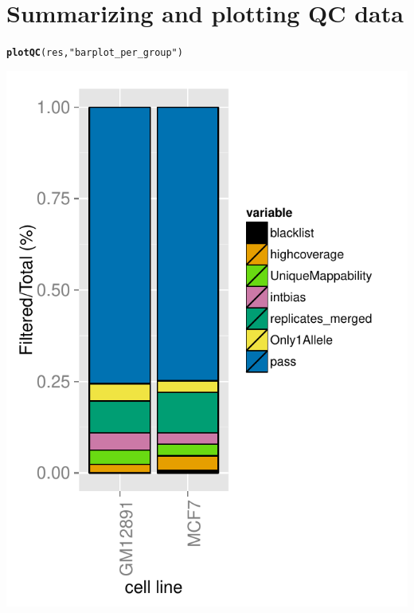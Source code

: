 \documentclass{article}\usepackage[]{graphicx}\usepackage[usenames,dvipsnames]{color}
\makeatletter
\def\maxwidth{ %
  \ifdim\Gin@nat@width>\linewidth
    \linewidth
  \else
    \Gin@nat@width
  \fi
}
\newcommand{\hlstr}[1]{\textcolor[rgb]{0.192,0.494,0.8}{#1}}%
\newcommand{\hlstd}[1]{\textcolor[rgb]{0.345,0.345,0.345}{#1}}%
\newcommand{\hlkwd}[1]{\textcolor[rgb]{0.737,0.353,0.396}{\textbf{#1}}}%
\newenvironment{kframe}{%
 \def\at@end@of@kframe{}%
 \ifinner\ifhmode%
  \def\at@end@of@kframe{\end{minipage}}%
  \begin{minipage}{\columnwidth}%
 \fi\fi%
 \def\FrameCommand##1{\hskip\@totalleftmargin \hskip-\fboxsep
 \colorbox{shadecolor}{##1}\hskip-\fboxsep
     \hskip-\linewidth \hskip-\@totalleftmargin \hskip\columnwidth}%
 \MakeFramed {\advance\hsize-\width
   \@totalleftmargin\z@ \linewidth\hsize
   \@setminipage}}%
 {\par\unskip\endMakeFramed%
 \at@end@of@kframe}
\newenvironment{knitrout}{}{} %
\makeatother
\begin{document}


\section{Summarizing and plotting QC data}



\begin{knitrout}
\color{fgcolor}\begin{kframe}
\begin{alltt}
\hlkwd{plotQC}\hlstd{(res,} \hlstr{"barplot_per_group"}\hlstd{)}
\end{alltt}
\end{kframe}

{\centering \includegraphics[width=\maxwidth]{figure/QCplots-1} 

}
\end{knitrout}
\end{document}
